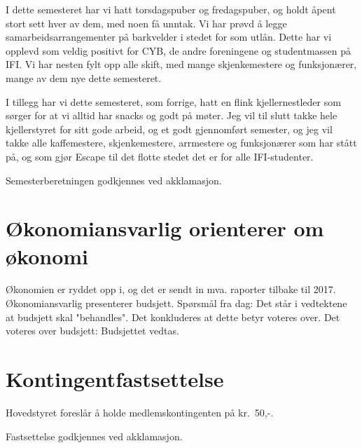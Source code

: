 \documentclass[10pt,norsk,a4paper,usenames,dvipsnames]{article}
\begin{document}
\begin{multicols}{2}
            I dette semesteret har vi hatt torsdagspuber og fredagspuber, og holdt åpent stort sett hver av
            dem, med noen få unntak. Vi har prøvd å legge samarbeidsarrangementer på barkvelder i
            stedet for som utlån. Dette har vi opplevd som veldig positivt for CYB, de andre foreningene og
            studentmassen på IFI. Vi har nesten fylt opp alle skift, med mange skjenkemestere og
            funksjonærer, mange av dem nye dette semesteret.

            I tillegg har vi dette semesteret, som forrige, hatt en flink kjellernestleder som sørger for at vi
            alltid har snacks og godt på møter.
            Jeg vil til slutt takke hele kjellerstyret for sitt gode arbeid, og et godt gjennomført semester, og
            jeg vil takke alle kaffemestere, skjenkemestere, arrmestere og funksjonærer som har stått på,
            og som gjør Escape til det flotte stedet det er for alle IFI-studenter.

        \end{multicols}

        Semesterberetningen godkjennes ved akklamasjon.


\section{Økonomiansvarlig orienterer om økonomi}
            Økonomien er ryddet opp i, og det er sendt in mva. raporter tilbake til 2017.
            Økonomiansvarlig presenterer budsjett.
            Spørsmål fra dag:
                Det står i vedtektene at budsjett skal "behandles". Det konkluderes at dette betyr voteres over.
            Det voteres over budsjett:
                Budsjettet vedtas.


\section{Kontingentfastsettelse}
    Hovedstyret foreslår å holde medlemskontingenten på kr.~50,-.

    Fastsettelse godkjennes ved akklamasjon.
\end{document}
